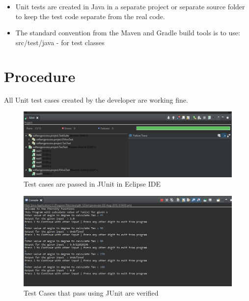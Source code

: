 \documentclass[11pt, english]{report}
\begin{document}
\begin{itemize}
    \item Unit tests are created in Java in a separate project or separate source folder to keep the test code separate from the real code.
    \item The standard convention from the Maven and Gradle build tools is to use:\\ 
    
    src/test/java - for test classes
\end{itemize}
 

\section{Procedure}

All Unit test cases created by the developer are working fine.

\begin{figure}[H]
  
  \includegraphics[width=1\textwidth]{testing/unittestspassed.PNG}
  \centering
  \caption{ Test cases are passed in JUnit\cite{unittest} in Eclipse IDE
}
\end{figure}


\begin{figure}[H]
  
  \includegraphics[width=1\textwidth]{testing/testedfortestcases.PNG}
  \centering
  \caption{ Test Cases that pass using JUnit are verified
}
\end{figure}
\end{document}
